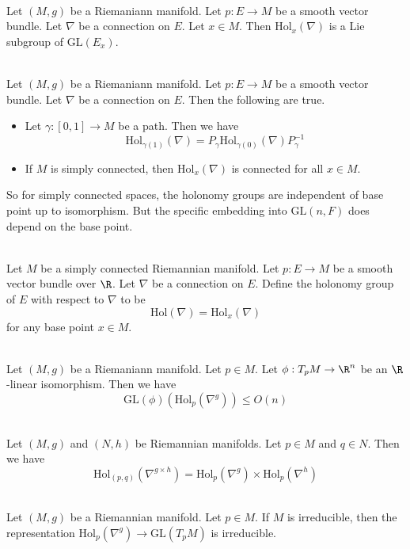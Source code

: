 \documentclass[a4paper]{article}
\begin{document}
\begin{lmm}{}{}\\
Let $(M,g)$ be a Riemaniann manifold. Let $p:E\to M$ be a smooth vector bundle. Let $\nabla$ be a connection on $E$. Let $x\in M$. Then $\text{Hol}_x(\nabla)$ is a Lie subgroup of $\text{GL}(E_x)$. 
\end{lmm}

\begin{prp}{}{}\\
Let $(M,g)$ be a Riemaniann manifold. Let $p:E\to M$ be a smooth vector bundle. Let $\nabla$ be a connection on $E$. Then the following are true. 
\begin{itemize}
\item Let $\gamma:[0,1]\to M$ be a path. Then we have $$\text{Hol}_{\gamma(1)}(\nabla)=P_\gamma\text{Hol}_{\gamma(0)}(\nabla)P_\gamma^{-1}$$
\item If $M$ is simply connected, then $\text{Hol}_x(\nabla)$ is connected for all $x\in M$. 
\end{itemize}
\end{prp}

So for simply connected spaces, the holonomy groups are independent of base point up to isomorphism. But the specific embedding into $\text{GL}(n,F)$ does depend on the base point. 

\begin{defn}{}{}\\
Let $M$ be a simply connected Riemannian manifold. Let $p:E\to M$ be a smooth vector bundle over $\R$. Let $\nabla$ be a connection on $E$. Define the holonomy group of $E$ with respect to $\nabla$ to be $$\text{Hol}(\nabla)=\text{Hol}_x(\nabla)$$ for any base point $x\in M$. 
\end{defn}

\begin{prp}{}{}\\
Let $(M,g)$ be a Riemaniann manifold. Let $p\in M$. Let $\phi:T_pM\to\R^n$ be an $\R$-linear isomorphism. Then we have $$\text{GL}(\phi)(\text{Hol}_p(\nabla^g))\leq O(n)$$
\end{prp}

\begin{prp}{}{}\\
Let $(M,g)$ and $(N,h)$ be Riemannian manifolds. Let $p\in M$ and $q\in N$. Then we have $$\text{Hol}_{(p,q)}(\nabla^{g\times h})=\text{Hol}_p(\nabla^g)\times\text{Hol}_p(\nabla^h)$$
\end{prp}

\begin{prp}{}{}\\
Let $(M,g)$ be a Riemannian manifold. Let $p\in M$. If $M$ is irreducible, then the representation $\text{Hol}_p(\nabla^g)\to\text{GL}(T_pM)$ is irreducible. 
\end{prp}
\end{document}
